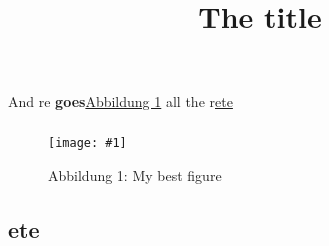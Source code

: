 \documentclass{article}
\newlength{\imgwidth}
\newcommand\scaledgraphics[2]{%
                
\settowidth{\imgwidth}{\texttt{[image: \#1]}}%
                
\setlength{\imgwidth}{\minof{\imgwidth}{#2\textwidth}}%
                
\texttt{[image: \#1]}%
                
}
\begin{document}
\title{The title}

\maketitle


And re \textbf{goes}\hyperref[F31672361]{Abbildung 1} all\autocite{datasearch-httpsdataverse-unc-eduoai--doi10-15139S3IZM98Z} the r\hyperref[H9227237]{ete}


\subsubsection{}\label{H1511511}



\begin{center}
\begin{figure}
\scaledgraphics{a48df1a1-fee3-4224-a0ae-f0806bef6a24.jpg}{0.5}
\caption*{Abbildung 1: My best figure}\label{F31672361}
\end{figure}


\end{center}


\subsection{ete}\label{H9227237}



\autocite{2006}


\printbibliography[title={Literaturverzeichnis}]
\end{document}
